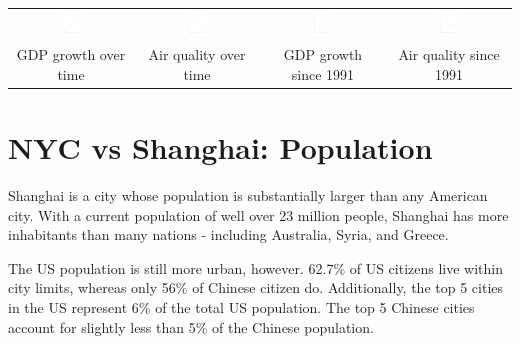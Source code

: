 \documentclass[12pt]{article}
\begin{document}
\begin{center}
\begin{tabular}{cccc}
  \includegraphics[width=0.2\textwidth]{img/growth_gdp}
& \includegraphics[width=0.2\textwidth]{img/air_quality}
& \includegraphics[width=0.2\textwidth]{img/growth_gdp_1991}
& \includegraphics[width=0.2\textwidth]{img/air_quality_1991}\\
   GDP growth over time & Air quality over time 
&  GDP growth since 1991 & Air quality since 1991
\end{tabular}
\end{center}

\section{NYC vs Shanghai: Population}

Shanghai is a city whose population is substantially larger than any
American city. With a current population of well over 23 million
people, Shanghai has more inhabitants than many nations - including
Australia, Syria, and Greece.

The US population is still more urban, however. 62.7\% of US citizens
live within city limits,\cite{us-census:2011} whereas only 56\% of
Chinese citizen do. Additionally, the top 5 cities in the US represent
6\% of the total US population\cite{us-census:2011}. The top 5 Chinese
cities account for slightly less than 5\% of the Chinese population.
\end{document}

